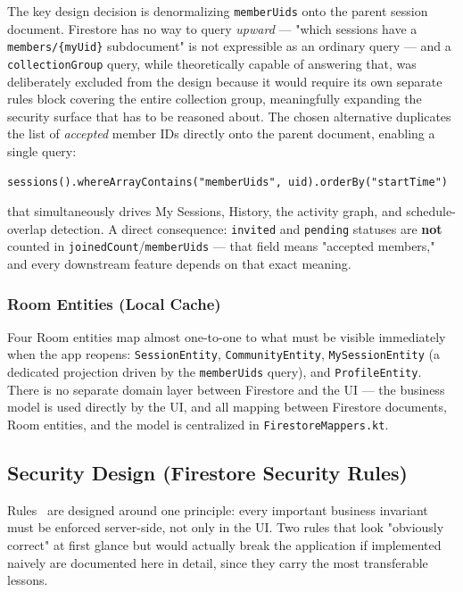 The key design decision is denormalizing \texttt{memberUids} onto the parent session document. Firestore has no way to query \emph{upward} — "which sessions have a \texttt{members/\{myUid\}} subdocument" is not expressible as an ordinary query — and a \texttt{collectionGroup} query, while theoretically capable of answering that, was deliberately excluded from the design because it would require its own separate rules block covering the entire collection group, meaningfully expanding the security surface that has to be reasoned about. The chosen alternative duplicates the list of \emph{accepted} member IDs directly onto the parent document, enabling a single query:

\begin{verbatim}
sessions().whereArrayContains("memberUids", uid).orderBy("startTime")
\end{verbatim}

that simultaneously drives My Sessions, History, the activity graph, and schedule-overlap detection. A direct consequence: \texttt{invited} and \texttt{pending} statuses are \textbf{not} counted in \texttt{joinedCount}/\texttt{memberUids} — that field means "accepted members," and every downstream feature depends on that exact meaning.

\subsubsection{Room Entities (Local Cache)}

Four Room entities map almost one-to-one to what must be visible immediately when the app reopens: \texttt{SessionEntity}, \texttt{CommunityEntity}, \texttt{MySessionEntity} (a dedicated projection driven by the \texttt{memberUids} query), and \texttt{ProfileEntity}. There is no separate domain layer between Firestore and the UI — the business model is used directly by the UI, and all mapping between Firestore documents, Room entities, and the model is centralized in \texttt{FirestoreMappers.kt}.

\subsection{Security Design (Firestore Security Rules)}
\label{sec:security}

Rules~\cite{firestore-rules} are designed around one principle: every important business invariant must be enforced server-side, not only in the UI. Two rules that look "obviously correct" at first glance but would actually break the application if implemented naively are documented here in detail, since they carry the most transferable lessons.

